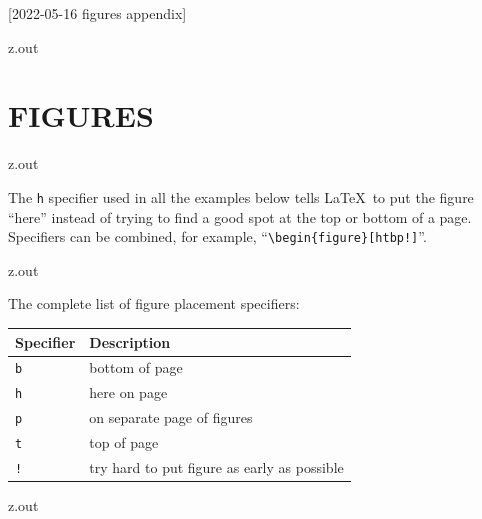 [2022-05-16 figures appendix]

\begin{VerbatimOut}{z.out}
\chapter{FIGURES}
\end{VerbatimOut}

\MyIO


\begin{VerbatimOut}{z.out}

The
\verb+h+
specifier used in all the examples below
tells \LaTeX\ to put the figure
``here''
instead of trying
to find a good spot
at the top or bottom of a page.
Specifiers can be combined,
for example,
``\verb+\begin{figure}[htbp!]+''.
\end{VerbatimOut}

\MyIO


\begin{VerbatimOut}{z.out}

The complete list of figure placement specifiers:
\vspace*{6pt}
\begin{center}
  \begin{tabular}{@{}ll@{}}
    \toprule
    \bf Specifier& \bf Description\\
    \midrule
    \noalign{\vspace*{2pt}}
    \tt b& bottom of page\\
    \tt h& here on page\\
    \tt p& on separate page of figures\\
    \tt t& top of page\\
    \tt !& try hard to put figure as early as possible\\
    \bottomrule
  \end{tabular}
\end{center}
\index{\verb+\begin{tabular}+}
\end{VerbatimOut}

\MyIO



\begin{VerbatimOut}{z.out}

\end{VerbatimOut}

